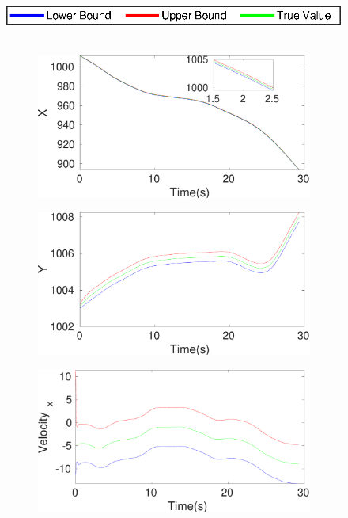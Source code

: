 \begin{figure}[h]
\hspace*{\fill} \includegraphics[scale=0.8]{figures/legend}\\\\
\begin{subfigure}{.5\linewidth}
\centering
\includegraphics[width=\linewidth]{figures/Frad/s3pmSMX}
\end{subfigure}
\begin{subfigure}{.5\linewidth}
\centering
\includegraphics[width=\linewidth]{figures/Frad/s3pmSMY}
\end{subfigure}
\begin{subfigure}{.5\linewidth}
\centering
\includegraphics[width=\linewidth]{figures/Frad/s3pmSMVelocity_x}

\end{subfigure}
\end{figure}
